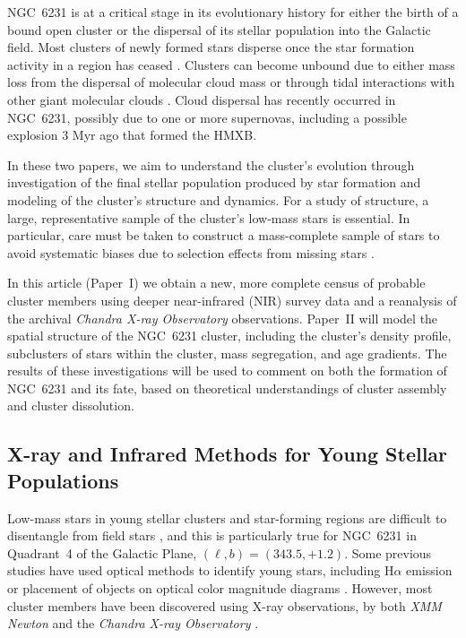 \documentclass[twocolumn,tighten]{aastex61}
\begin{document}
NGC~6231 is at a critical stage in its evolutionary history for either the birth of a bound open cluster or the dispersal of its stellar population into the Galactic field. Most clusters of newly formed stars disperse once the star formation activity in a region has ceased \citep{2003ARA&A..41...57L}. Clusters can become unbound due to either mass loss from the dispersal of molecular cloud mass \citep{1978A&A....70...57T,1980ApJ...235..986H} or through tidal interactions with other giant molecular clouds \citep{2012MNRAS.426.3008K}. Cloud dispersal has recently occurred in NGC~6231, possibly due to one or more supernovas, including a possible explosion 3 Myr ago that formed the HMXB. 

In these two papers, we aim to understand the cluster's evolution through investigation of the final stellar population produced by star formation and modeling of the cluster's structure and dynamics. For a study of structure, a large, representative sample of the cluster's low-mass stars is essential. 
In particular, care must be taken to construct a mass-complete sample of stars to avoid systematic biases due to selection effects from missing stars \citep[e.g.,][]{2009A&A...495..147A}.

In this article (Paper~I) we obtain a new, more complete census of probable cluster members using deeper near-infrared (NIR)  survey data and a reanalysis of the archival {\it Chandra X-ray Observatory} observations. Paper~II will model the spatial structure of the NGC~6231 cluster, including the cluster's density profile, subclusters of stars within the cluster, mass segregation, and age gradients. The results of these investigations will be used to comment on both the formation of NGC~6231 and its fate, based on theoretical understandings of cluster assembly and cluster dissolution.




\subsection{X-ray and Infrared Methods for Young Stellar Populations}

Low-mass stars in young stellar clusters and star-forming regions are difficult to disentangle from field stars \citep{2013ApJS..209...26F}, and this is particularly true for NGC~6231 in Quadrant~4 of the Galactic Plane, $(\ell,b)=(343.5,+1.2)$. Some previous studies have used optical methods to identify young stars, including H$\alpha$ emission \citep[e.g.,][]{1998AJ....115..734S} or placement of objects on optical color magnitude diagrams \citep[e.g.,][]{2016arXiv160708860D}. However, most cluster members have been discovered using X-ray observations, by both {\it XMM Newton} \citep{2004MNRAS.350..809S,2005A&A...441..213S,2006MNRAS.371...67S,2006A&A...454.1047S,2006MNRAS.372..661S,2007ApJ...659.1582S,2007MNRAS.377..945S,2008MNRAS.386..447S,2008NewA...13..202S} and the {\it Chandra X-ray Observatory} \citep[][henceforth DMS2016]{2016arXiv160708860D}.
\end{document}
